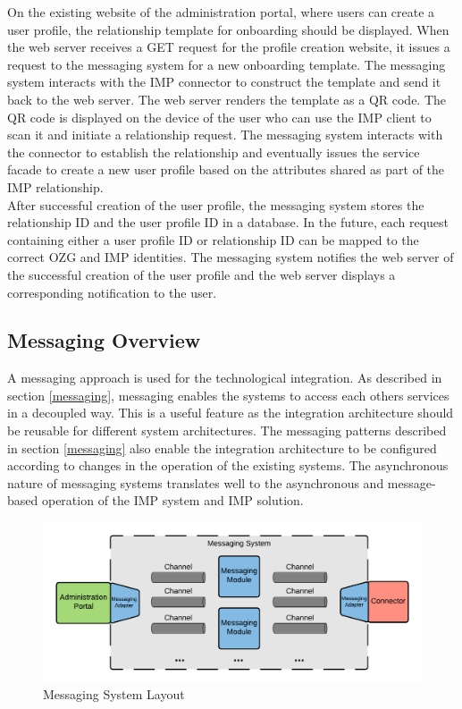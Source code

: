 On the existing website of the administration portal, where users can create a user profile, the relationship template for onboarding should be displayed. When the web server receives a GET request for the profile creation website, it issues a request to the messaging system for a new onboarding template. The messaging system interacts with the IMP connector to construct the template and send it back to the web server. The web server renders the template as a QR code. The QR code is displayed on the device of the user who can use the IMP client to scan it and initiate a relationship request. The messaging system interacts with the connector to establish the relationship and eventually issues the service facade to create a new user profile based on the attributes shared as part of the IMP relationship. \\
After successful creation of the user profile, the messaging system stores the relationship ID and the user profile ID in a database. In the future, each request containing either a user profile ID or relationship ID can be mapped to the correct OZG and IMP identities. The messaging system notifies the web server of the successful creation of the user profile and the web server displays a corresponding notification to the user.

\subsection{Messaging Overview}

A messaging approach is used for the technological integration. As described in section \ref{messaging}, messaging enables the systems to access each others services in a decoupled way. This is a useful feature as the integration architecture should be reusable for different system architectures. The messaging patterns described in section \ref{messaging} also enable the integration architecture to be configured according to changes in the operation of the existing systems. The asynchronous nature of messaging systems translates well to the asynchronous and message-based operation of the IMP system and IMP solution.

\begin{figure}[h!]
    \centering
    \includegraphics[scale=0.6]{Diagrams/Integration Architecture 1/Technological Integration/3. Messaging Integration.pdf}
    \caption{Messaging System Layout}
    \label{integration1:messaging_integration}
\end{figure}


